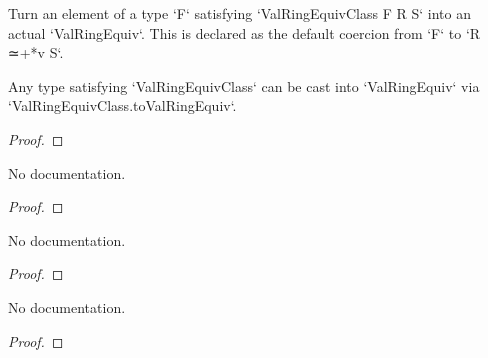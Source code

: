 \begin{definition}\label{ValRingEquivClass.toValRingEquiv}
        \leanok
                Turn an element of a type `F` satisfying `ValRingEquivClass F R S` into an actual
`ValRingEquiv`. This is declared as the default coercion from `F` to `R ≃+*v S`.
    \end{definition}

\begin{theorem}\label{ValAlgebra.val_map_le_iff}
        \leanok
                Any type satisfying `ValRingEquivClass` can be cast into `ValRingEquiv` via
`ValRingEquivClass.toValRingEquiv`.
    \end{theorem}

\begin{proof}
    \leanok
\end{proof}

\begin{theorem}\label{ValAlgebra.val_map_lt_iff}
        \leanok
                No documentation.
    \end{theorem}

\begin{proof}
    \leanok
\end{proof}

\begin{theorem}\label{ValAlgebra.val_map_le_one_iff}
        \leanok
                No documentation.
    \end{theorem}

\begin{proof}
    \leanok
\end{proof}

\begin{theorem}\label{ValAlgebra.val_map_lt_one_iff}
        \leanok
                No documentation.
    \end{theorem}

\begin{proof}
    \leanok
\end{proof}


